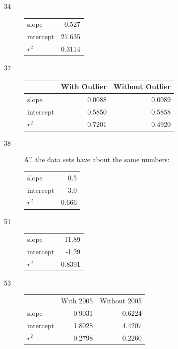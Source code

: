 \documentclass[letterpaper, landscape]{exam}
\begin{document}
    \begin{description}
      \item[34]
        \begin{tabular}[H]{lr}
          \toprule
          slope     & 0.527 \\
          intercept & 27.635 \\
          $r^2$     & 0.3114 \\
          \bottomrule
        \end{tabular}

      \item[37]
          \begin{tabular}[H]{lrr}
            \toprule
                      & With Outlier & Without Outlier \\
            \midrule
            slope     & 0.0088       & 0.0089 \\
            intercept & 0.5850       & 0.5858 \\
            $r^2$     & 0.7201       & 0.4920 \\
            \bottomrule
          \end{tabular}

      \item[38]
        All the data sets have about the same numbers:

          \begin{tabular}[H]{lr}
            \toprule
            slope     & 0.5   \\
            intercept & 3.0   \\
            $r^2$     & 0.666 \\
            \bottomrule
          \end{tabular}

      \item[51]
        \begin{tabular}[H]{lr}
          \toprule
          slope     & 11.89 \\
          intercept & -1.29 \\
          $r^2$     & 0.8391 \\
          \bottomrule
        \end{tabular}

      \item[53]
        \begin{tabular}[H]{lrr}
          \toprule
                    & With 2005 & Without 2005 \\
          slope     & 0.9031    & 0.6224 \\
          intercept & 1.8028    & 4.4207 \\
          $r^2$     & 0.2798    & 0.2260 \\
          \bottomrule
        \end{tabular}

    \end{description}
  \fi
\end{document}
